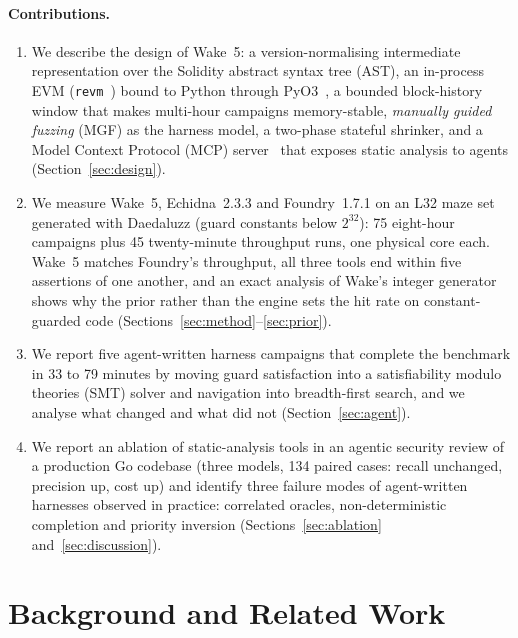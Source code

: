 \documentclass[11pt,a4paper]{article}
\newcommand{\wake}{Wake}
\newcommand{\revm}{\texttt{revm}}
\begin{document}
\paragraph{Contributions.}
\begin{enumerate}
  \item We describe the design of \wake{}~5: a version-normalising intermediate representation over the Solidity abstract syntax tree (AST), an in-process EVM (\revm{}~\cite{revm}) bound to Python through PyO3~\cite{pyo3}, a bounded block-history window that makes multi-hour campaigns memory-stable, \emph{manually guided fuzzing} (MGF) as the harness model, a two-phase stateful shrinker, and a Model Context Protocol (MCP) server~\cite{mcp} that exposes static analysis to agents (Section~\ref{sec:design}).
  \item We measure \wake{}~5, Echidna~2.3.3 and Foundry~1.7.1 on an L32 maze set generated with Daedaluzz (guard constants below $2^{32}$): 75 eight-hour campaigns plus 45 twenty-minute throughput runs, one physical core each. \wake{}~5 matches Foundry's throughput, all three tools end within five assertions of one another, and an exact analysis of \wake{}'s integer generator shows why the prior rather than the engine sets the hit rate on constant-guarded code (Sections~\ref{sec:method}--\ref{sec:prior}).
  \item We report five agent-written harness campaigns that complete the benchmark in 33 to 79 minutes by moving guard satisfaction into a satisfiability modulo theories (SMT) solver and navigation into breadth-first search, and we analyse what changed and what did not (Section~\ref{sec:agent}).
  \item We report an ablation of static-analysis tools in an agentic security review of a production Go codebase (three models, 134 paired cases: recall unchanged, precision up, cost up) and identify three failure modes of agent-written harnesses observed in practice: correlated oracles, non-deterministic completion and priority inversion (Sections~\ref{sec:ablation} and~\ref{sec:discussion}).
\end{enumerate}

\section{Background and Related Work}
\label{sec:background}
\end{document}
